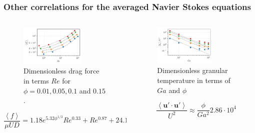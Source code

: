 \documentclass{sintefbeamer}
\newcommand{\avg}[1]{\left<#1\right>}
\begin{document}
\begin{frame}
  \frametitle{Other correlations for the averaged Navier Stokes equations}
\begin{columns}
  \begin{column}{0.5\textwidth}
    \begin{figure}
      \includegraphics[width=0.7\textwidth]{image/HOMOGENEOUS/fCA/FH_mu_Re.pdf}
      \caption{Dimensionless drag force in terms $Re$ for $\phi = 0.01, 0.05, 0.1$ and $0.15$.}
    \end{figure}
    \begin{equation*}
      \frac{\avg{f}}{\mu UD} 
      = 1.18 e^{5.32\phi^{1/3}}  Re^{0.33}  + Re^{0.87} +24.12
    \end{equation*}
  \end{column}
  \begin{column}{0.5\textwidth}
    \begin{figure}[h!]
      \centering
      \includegraphics[width=0.7\textwidth]{image/HOMOGENEOUS/fPA/Talpha.pdf}
      \caption{Dimensionless granular temperature in terms of $Ga$ and $\phi$}
  \end{figure}
  	\begin{equation}
    \frac{\avg{\textbf{u}'\cdot \textbf{u}'}}{U^2}  
    \approx \frac{\phi}{Ga^2} 2.86\cdot10^{4} 
    \label{eq:Talpha_scaling}
	\end{equation}
  \end{column}
\end{columns}
\end{frame}
\end{document}
